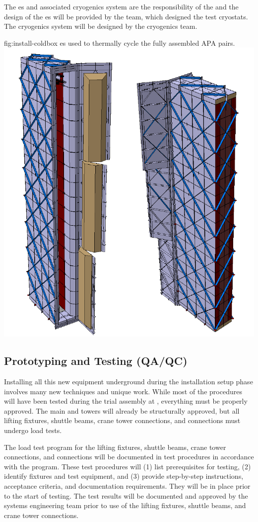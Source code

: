 The \coldbox{}es and associated cryogenics system are the responsibility of the  and the design of the \coldbox{}es will be provided by the  team, which designed the  test cryostats. The cryogenics system will be designed by the  cryogenics team. 

\begin{dunefigure}{fig:install-coldbox}
  {\Coldbox{}es used to thermally cycle the fully assembled APA pairs. }
\includegraphics[width=.5\textwidth]{graphics/install-coldbox.pdf}
\end{dunefigure}





\subsection{Prototyping and Testing (QA/QC)}
\label{sec:fdsp-tc-infr-qaqc}


Installing all this new equipment underground during the installation setup phase involves many new techniques  and unique work. While most of the procedures will have been tested during the trial assembly at , everything must be properly approved. The main  and  towers will already be structurally approved, but all lifting fixtures, shuttle beams, crane tower connections, and \coldbox connections must undergo load tests. 


The load test program for the lifting fixtures, shuttle beams, crane tower connections, and \coldbox connections will be documented in test procedures in accordance with the    program.  
These test procedures will (1) list prerequisites for testing, (2) identify fixtures and test equipment, and (3) provide step-by-step instructions, acceptance criteria, and documentation requirements.
They will be in place prior to the start of testing. 
The test results will be documented and approved by the systems engineering team prior to use of the lifting fixtures, shuttle beams, and crane tower connections. %

